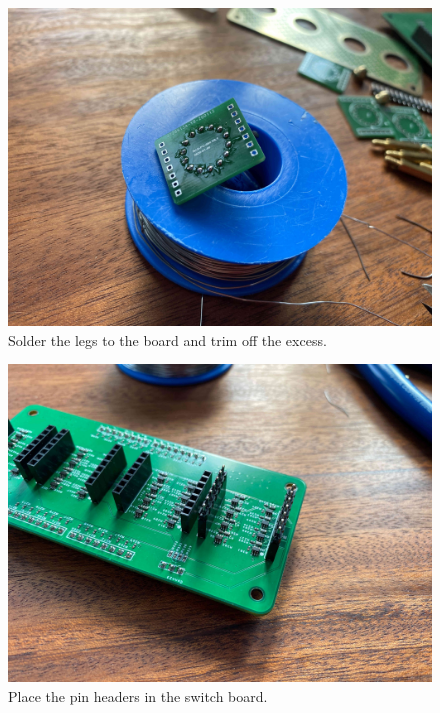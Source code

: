 \documentclass[12pt]{article}
\begin{document}
\begin{figure}[t]
\includegraphics[scale=0.05]{IMG_1109}
\centering
\caption{Solder the legs to the board and trim off the excess.}
\label{fig:tubetrim}
\end{figure}

\begin{figure}[t]
\includegraphics[scale=0.05]{IMG_1111}
\centering
\caption{Place the pin headers in the switch board.}
\end{figure}
\end{document}
